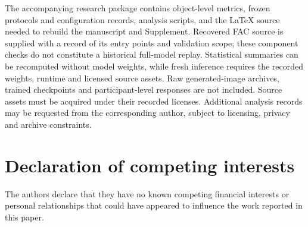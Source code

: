\documentclass[times,twocolumn,final]{elsarticle}
\begin{document}
The accompanying research package contains object-level metrics, frozen protocols and configuration records, analysis scripts, and the LaTeX source needed to rebuild the manuscript and Supplement. Recovered FAC source is supplied with a record of its entry points and validation scope; these component checks do not constitute a historical full-model replay. Statistical summaries can be recomputed without model weights, while fresh inference requires the recorded weights, runtime and licensed source assets. Raw generated-image archives, trained checkpoints and participant-level responses are not included. Source assets must be acquired under their recorded licenses. Additional analysis records may be requested from the corresponding author, subject to licensing, privacy and archive constraints.

\section*{Declaration of competing interests}

The authors declare that they have no known competing financial interests or personal relationships that could have appeared to influence the work reported in this paper.
\end{document}
